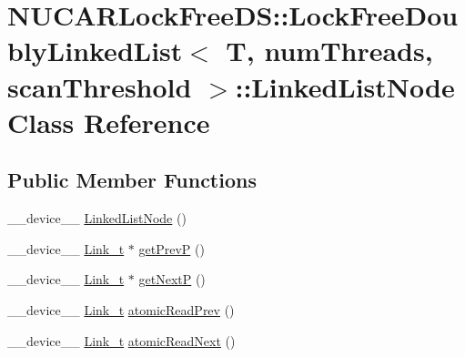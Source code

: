 \hypertarget{class_n_u_c_a_r_lock_free_d_s_1_1_lock_free_doubly_linked_list_1_1_linked_list_node}{}\section{N\+U\+C\+A\+R\+Lock\+Free\+DS\+:\+:Lock\+Free\+Doubly\+Linked\+List$<$ T, num\+Threads, scan\+Threshold $>$\+:\+:Linked\+List\+Node Class Reference}
\label{class_n_u_c_a_r_lock_free_d_s_1_1_lock_free_doubly_linked_list_1_1_linked_list_node}
\subsection*{Public Member Functions}
\begin{DoxyCompactItemize}
\item 
\+\_\+\+\_\+device\+\_\+\+\_\+ \mbox{\hyperlink{class_n_u_c_a_r_lock_free_d_s_1_1_lock_free_doubly_linked_list_1_1_linked_list_node_a47208e6922870bba81cbd7c59265b4b4}{Linked\+List\+Node}} ()
\item 
\+\_\+\+\_\+device\+\_\+\+\_\+ \mbox{\hyperlink{class_n_u_c_a_r_lock_free_d_s_1_1_lock_free_doubly_linked_list_a08f21d5e04bc2a02d6c1d8861a6ba0de}{Link\+\_\+t}} $\ast$ \mbox{\hyperlink{class_n_u_c_a_r_lock_free_d_s_1_1_lock_free_doubly_linked_list_1_1_linked_list_node_ae1a75bbfaccfe1d566803fbeb2298679}{get\+PrevP}} ()
\item 
\+\_\+\+\_\+device\+\_\+\+\_\+ \mbox{\hyperlink{class_n_u_c_a_r_lock_free_d_s_1_1_lock_free_doubly_linked_list_a08f21d5e04bc2a02d6c1d8861a6ba0de}{Link\+\_\+t}} $\ast$ \mbox{\hyperlink{class_n_u_c_a_r_lock_free_d_s_1_1_lock_free_doubly_linked_list_1_1_linked_list_node_ae06fa31bdcd570875cd83af2c78bdd3b}{get\+NextP}} ()
\item 
\+\_\+\+\_\+device\+\_\+\+\_\+ \mbox{\hyperlink{class_n_u_c_a_r_lock_free_d_s_1_1_lock_free_doubly_linked_list_a08f21d5e04bc2a02d6c1d8861a6ba0de}{Link\+\_\+t}} \mbox{\hyperlink{class_n_u_c_a_r_lock_free_d_s_1_1_lock_free_doubly_linked_list_1_1_linked_list_node_ae5bc375f39c02a40709a9ada2469ca66}{atomic\+Read\+Prev}} ()
\item 
\+\_\+\+\_\+device\+\_\+\+\_\+ \mbox{\hyperlink{class_n_u_c_a_r_lock_free_d_s_1_1_lock_free_doubly_linked_list_a08f21d5e04bc2a02d6c1d8861a6ba0de}{Link\+\_\+t}} \mbox{\hyperlink{class_n_u_c_a_r_lock_free_d_s_1_1_lock_free_doubly_linked_list_1_1_linked_list_node_aaba42c339b0a5dc28eb40fca182e104a}{atomic\+Read\+Next}} ()
\end{DoxyCompactItemize}
